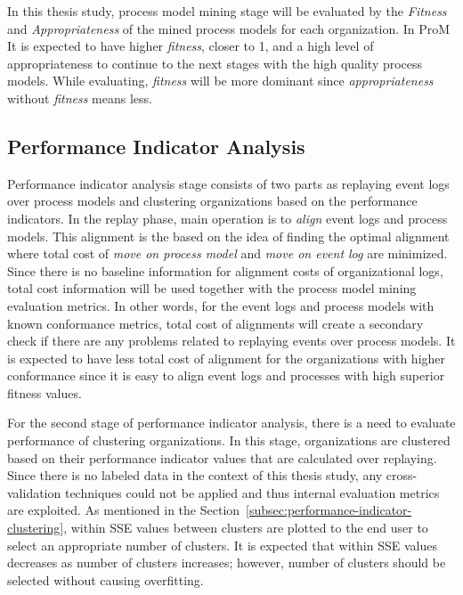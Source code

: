 In this thesis study, process model mining stage will be evaluated by the \textit{Fitness} and \textit{Appropriateness} of the mined process models for each organization. In ProM  It is expected to have higher \textit{fitness}, closer to 1, and a high level of appropriateness to continue to the next stages with the high quality process models. While evaluating, \textit{fitness} will be more dominant since \textit{appropriateness} without \textit{fitness} means less.


\subsection{Performance Indicator Analysis}
\label{subsec:performance-indicator-analysis-eval}
Performance indicator analysis stage consists of two parts as replaying event logs over process models and clustering organizations based on the performance indicators. In the replay phase, main operation is to \textit{align} \cite{van2012replaying} event logs and process models. This alignment is the based on the idea of finding the optimal alignment where total cost of \textit{move on process model} and \textit{move on event log} are minimized. Since there is no baseline information for alignment costs of organizational logs, total cost information will be used together with the process model mining evaluation metrics. In other words, for the event logs and process models with known conformance metrics, total cost of alignments will create a secondary check if there are any problems related to replaying events over process models. It is expected to have less total cost of alignment for the organizations with higher conformance since it is easy to align event logs and processes with high superior fitness values.


For the second stage of performance indicator analysis, there is a need to evaluate performance of clustering organizations. In this stage, organizations are clustered  based on their performance indicator values that are calculated over replaying. Since there is no labeled data in the context of this thesis study, any cross-validation techniques could not be applied and thus internal evaluation metrics are exploited. As mentioned in the Section~\ref{subsec:performance-indicator-clustering}, within SSE values between clusters are plotted to the end user to select an appropriate number of clusters. It is expected that within SSE values decreases as number of clusters increases; however, number of clusters should be selected without causing overfitting.

